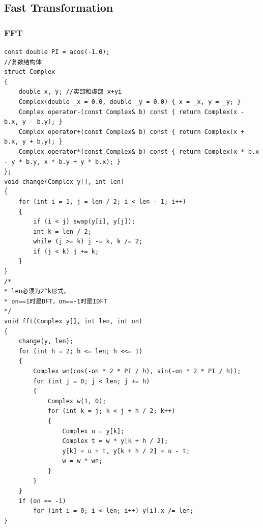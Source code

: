 \documentclass[twoside]{article}
\begin{document}
\subsection{Fast Transformation}
\subsubsection{FFT}
\begin{lstlisting}
const double PI = acos(-1.0);
//复数结构体
struct Complex
{
    double x, y; //实部和虚部 x+yi
    Complex(double _x = 0.0, double _y = 0.0) { x = _x, y = _y; }
    Complex operator-(const Complex& b) const { return Complex(x - b.x, y - b.y); }
    Complex operator+(const Complex& b) const { return Complex(x + b.x, y + b.y); }
    Complex operator*(const Complex& b) const { return Complex(x * b.x - y * b.y, x * b.y + y * b.x); }
};
void change(Complex y[], int len)
{
    for (int i = 1, j = len / 2; i < len - 1; i++)
    {
        if (i < j) swap(y[i], y[j]);
        int k = len / 2;
        while (j >= k) j -= k, k /= 2;
        if (j < k) j += k;
    }
}
/*
* len必须为2^k形式，
* on==1时是DFT，on==-1时是IDFT
*/
void fft(Complex y[], int len, int on)
{
    change(y, len);
    for (int h = 2; h <= len; h <<= 1)
    {
        Complex wn(cos(-on * 2 * PI / h), sin(-on * 2 * PI / h));
        for (int j = 0; j < len; j += h)
        {
            Complex w(1, 0);
            for (int k = j; k < j + h / 2; k++)
            {
                Complex u = y[k];
                Complex t = w * y[k + h / 2];
                y[k] = u + t, y[k + h / 2] = u - t;
                w = w * wn;
            }
        }
    }
    if (on == -1)
        for (int i = 0; i < len; i++) y[i].x /= len;
}
\end{lstlisting}
\end{document}
